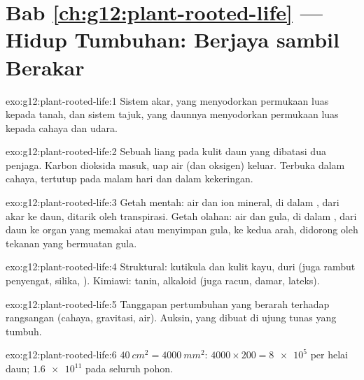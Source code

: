\section*{Bab \ref{ch:g12:plant-rooted-life} --- Hidup Tumbuhan: Berjaya sambil Berakar}

\begin{solution}{exo:g12:plant-rooted-life:1}
Sistem akar, yang  menyodorkan permukaan luas kepada
tanah, dan sistem tajuk, yang daunnya menyodorkan permukaan luas kepada
cahaya dan udara.
\end{solution}

\begin{solution}{exo:g12:plant-rooted-life:2}
Sebuah liang pada kulit daun yang dibatasi dua  penjaga. Karbon
dioksida masuk, uap air (dan oksigen) keluar. Terbuka dalam cahaya,
tertutup pada malam hari dan dalam kekeringan.
\end{solution}

\begin{solution}{exo:g12:plant-rooted-life:3}
Getah mentah: air dan ion mineral, di dalam , dari akar ke daun,
ditarik oleh transpirasi. Getah olahan: air dan gula, di dalam ,
dari daun ke organ yang memakai atau menyimpan gula, ke kedua arah,
didorong oleh tekanan  yang bermuatan gula.
\end{solution}

\begin{solution}{exo:g12:plant-rooted-life:4}
Struktural: kutikula dan kulit kayu, duri (juga rambut penyengat,
silika, ). Kimiawi: tanin, alkaloid (juga racun, damar,
lateks).
\end{solution}

\begin{solution}{exo:g12:plant-rooted-life:5}
Tanggapan pertumbuhan yang berarah terhadap rangsangan (cahaya,
gravitasi, air). Auksin, yang dibuat di ujung tunas yang tumbuh.
\end{solution}

\begin{solution}{exo:g12:plant-rooted-life:6}
$\qty{40}{cm^2} = \qty{4000}{mm^2}$: $4000 \times 200 = \num{8e5}$
 per helai daun; $\num{1.6e11}$ pada seluruh pohon.
\end{solution}

